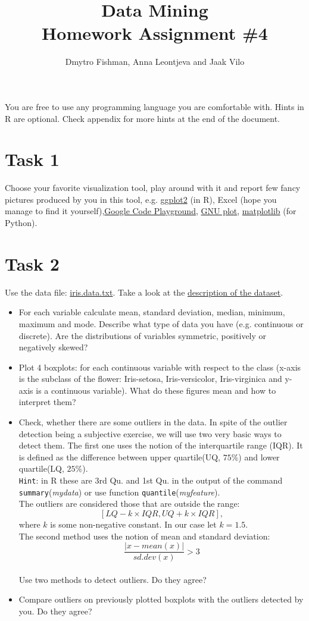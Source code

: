 \documentclass{article}
\title{Data Mining\\Homework Assignment \#4} %
\author{Dmytro Fishman, Anna Leontjeva and Jaak Vilo} %
\begin{document}
\maketitle %

You are free to use any programming language you are comfortable with. Hints in R are optional. Check appendix for more hints at the end of the document.
\section*{Task 1}
Choose your favorite visualization tool, play around with it and report few fancy pictures produced by you in this tool, e.g. \href{http://docs.ggplot2.org/current/}{ggplot2} (in R), Excel (hope you manage to find it yourself),\href{https://code.google.com/apis/ajax/playground/?type=visualization#motion_chart}{Google Code Playground}, \href{http://www.gnuplot.info/}{GNU plot}, \href{http://matplotlib.org/}{matplotlib} (for Python).
\section*{Task 2}
Use the data file: \href{http://www0.cs.ucl.ac.uk/staff/m.herbster/GI07/week4/iris.data.txt}{iris.data.txt}. Take a look at the \href{http://archive.ics.uci.edu/ml/datasets/Iris}{description of the dataset}. 
\begin{itemize}
\item For each variable calculate mean, standard deviation, median, minimum, maximum and mode. Describe what type of data you have (e.g. continuous or discrete). Are the distributions of variables symmetric, positively or negatively skewed?
\item Plot 4 boxplots: for each continuous variable with respect to the class (x-axis is the subclass of the flower: Iris-setosa, Iris-versicolor, Iris-virginica and y-axis is a continuous variable). What do these figures mean and how to interpret them? 
\item Check, whether there are some outliers in the data. In spite of the outlier detection being a subjective exercise, we will use two very basic ways to detect them. The first one uses the notion of the interquartile range (IQR). It is defined as the difference between upper quartile(UQ, $75\%$) and lower quartile(LQ, $25\%$).\\ 
\texttt{Hint}: in R these are 3rd Qu. and 1st Qu. in the output of the command \texttt{summary}(\emph{mydata}) or use function \texttt{quantile}(\emph{myfeature}).\\ 

The outliers are considered those that are outside the range:
$$[LQ - k\times IQR, UQ + k \times IQR],$$
where $k$ is some non-negative constant. In our case let $k = 1.5$.\\
The second method uses the notion of mean and standard deviation:
$$\frac{|x-mean(x)|}{sd.dev(x)} > 3$$\\ Use two methods to detect outliers. Do they agree?
\item Compare outliers on previously plotted boxplots with the outliers detected by you. Do they agree? 
\end{itemize}
\end{document}
